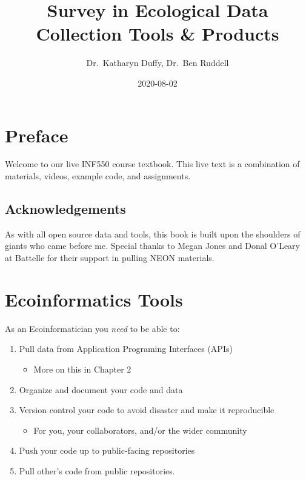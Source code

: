 \documentclass[]{book}
\title{Survey in Ecological Data Collection Tools \& Products}
\author{Dr.~Katharyn Duffy, Dr.~Ben Ruddell}
\date{2020-08-02}
\providecommand{\tightlist}{%
  \setlength{\itemsep}{0pt}\setlength{\parskip}{0pt}}
\begin{document}
\maketitle

{
\setcounter{tocdepth}{1}
\tableofcontents
}
\hypertarget{preface}{%
\chapter*{Preface}\label{preface}}

Welcome to our live INF550 course textbook. This live text is a combination of materials, videos, example code, and assignments.

\hypertarget{acknowledgements}{%
\section*{Acknowledgements}\label{acknowledgements}}

As with all open source data and tools, this book is built upon the shoulders of giants who came before me. Special thanks to Megan Jones and Donal O'Leary at Battelle for their support in pulling NEON materials.

\hypertarget{ecoinformatics-tools}{%
\chapter{Ecoinformatics Tools}\label{ecoinformatics-tools}}

As an Ecoinformatician you \emph{need} to be able to:

\begin{enumerate}
\def\labelenumi{\arabic{enumi}.}
\item
  Pull data from Application Programing Interfaces (APIs)

  \begin{itemize}
  \tightlist
  \item
    More on this in Chapter 2
  \end{itemize}
\item
  Organize and document your code and data
\item
  Version control your code to avoid disaster and make it reproducible

  \begin{itemize}
  \tightlist
  \item
    For you, your collaborators, and/or the wider community
  \end{itemize}
\item
  Push your code up to public-facing repositories
\item
  Pull other's code from public repositories.
\end{enumerate}
\end{document}
